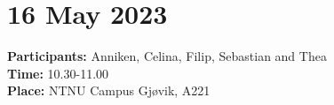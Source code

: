 \section{16 May 2023}
\textbf{Participants:} Anniken, Celina, Filip, Sebastian and Thea\\
\textbf{Time:} 10.30-11.00 \\
\textbf{Place:} NTNU Campus Gjøvik, A221
\\~\\